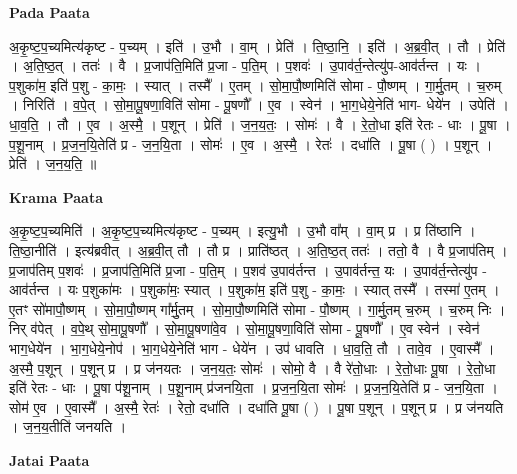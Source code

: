 \documentclass[17pt]{extarticle}
\begin{document}
\textbf{Pada Paata} \newline

अ॒कृ॒ष्ट॒प॒च्यमित्य॑कृष्ट - प॒च्यम् । इति॑ । उ॒भौ । वा॒म् । प्रेति॑ । ति॒ष्ठा॒नि॒ । इति॑ । अ॒ब्र॒वी॒त् । तौ । प्रेति॑ । अ॒ति॒ष्ठ॒त् । ततः॑ । वै । प्र॒जाप॑ति॒मिति॑ प्र॒जा - प॒ति॒म् । प॒शवः॑ । उ॒पाव॑र्त॒न्तेत्यु॑प-आव॑र्तन्त । यः । प॒शुका॑म॒ इति॑ प॒शु - का॒मः॒ । स्यात् । तस्मै᳚ । ए॒तम् । सो॒मा॒पौ॒ष्णमिति॑ सोमा - पौ॒ष्णम् । गा॒र्मु॒तम् । च॒रुम् । निरिति॑ । व॒पे॒त् । सो॒मा॒पू॒षणा॒विति॑ सोमा - पू॒षणौ᳚ । ए॒व । स्वेन॑ । भा॒ग॒धेये॒नेति॑ भाग- धेये॑न । उपेति॑ । धा॒व॒ति॒ । तौ । ए॒व । अ॒स्मै॒ । प॒शून् । प्रेति॑ । ज॒न॒य॒तः॒ । सोमः॑ । वै । रे॒तो॒धा इति॑ रेतः - धाः । पू॒षा । प॒शू॒नाम् । प्र॒ज॒न॒यि॒तेति॑ प्र - ज॒न॒यि॒ता । सोमः॑ । ए॒व । अ॒स्मै॒ । रेतः॑ । दधा॑ति । पू॒षा ( ) । प॒शून् । प्रेति॑ । ज॒न॒य॒ति॒ ॥  \newline


\textbf{Krama Paata} \newline

अ॒कृ॒ष्ट॒प॒च्यमिति॑ । अ॒कृ॒ष्ट॒प॒च्यमित्य॑कृष्ट - प॒च्यम् । इत्यु॒भौ । उ॒भौ वा᳚म् । वा॒म् प्र । प्र ति॑ष्ठानि । ति॒ष्ठा॒नीति॑ । 
इत्य॑ब्रवीत् । अ॒ब्र॒वी॒त् तौ । तौ प्र । प्राति॑ष्ठत् । अ॒ति॒ष्ठ॒त् ततः॑ । ततो॒ वै । वै प्र॒जाप॑तिम् । प्र॒जाप॑तिम् प॒शवः॑ । प्र॒जाप॑ति॒मिति॑ प्र॒जा - प॒ति॒म् । प॒शव॑ उ॒पाव॑र्तन्त । उ॒पाव॑र्तन्त॒ यः । उ॒पाव॑र्त॒न्तेत्यु॑प - आव॑र्तन्त । यः प॒शुका॑मः । प॒शुका॑मः॒ 
स्यात् । प॒शुका॑म॒ इति॑ प॒शु - का॒मः॒ । स्यात् तस्मै᳚ । तस्मा॑ ए॒तम् । ए॒तꣳ सो॑मापौ॒ष्णम् । सो॒मा॒पौ॒ष्णम् गा᳚र्मु॒तम् । सो॒मा॒पौ॒ष्णमिति॑ सोमा - पौ॒ष्णम् । गा॒र्मु॒तम् च॒रुम् । च॒रुम् निः । निर् व॑पेत् । व॒पे॒थ् सो॒मा॒पू॒षणौ᳚ । सो॒मा॒पू॒षणा॑वे॒व । सो॒मा॒पू॒षणा॒विति॑ सोमा - पू॒षणौ᳚ । ए॒व स्वेन॑ । स्वेन॑ भाग॒धेये॑न । भा॒ग॒धेये॒नोप॑ । भा॒ग॒धेये॒नेति॑ भाग - धेये॑न । उप॑ धावति । धा॒व॒ति॒ तौ । तावे॒व । ए॒वास्मै᳚ । अ॒स्मै॒ प॒शून् । प॒शून् प्र । प्र ज॑नयतः । ज॒न॒य॒तः॒ सोमः॑ । सोमो॒ वै । वै रे॑तो॒धाः । रे॒तो॒धाः पू॒षा । रे॒तो॒धा इति॑ रेतः - धाः । पू॒षा प॑शू॒नाम् । प॒शू॒नाम् प्र॑जनयि॒ता । प्र॒ज॒न॒यि॒ता सोमः॑ । प्र॒ज॒न॒यि॒तेति॑ प्र - ज॒न॒यि॒ता । सोम॑ ए॒व । ए॒वास्मै᳚ । अ॒स्मै॒ रेतः॑ । रेतो॒ दधा॑ति । दधा॑ति पू॒षा ( ) । पू॒षा प॒शून् । प॒शून् प्र । प्र ज॑नयति । ज॒न॒य॒तीति॑ जनयति । \newline

\textbf{Jatai Paata} \newline
\end{document}
